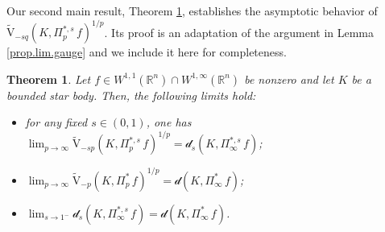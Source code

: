 \documentclass[11pt, reqno]{article}
\newtheorem{theorem}{Theorem}[section]
\theoremstyle{definition}
\numberwithin{equation}{section}
\newcommand{\R}{\mathbb{R}}
\newcommand{\vtil}{\widetilde{\mathrm{V}}}
\newcommand{\dila}{\mathscr{d}}
\begin{document}



\medskip

Our second main result, Theorem \ref{thm.mixed-dila}, establishes the asymptotic behavior of $\vtil_{-sq} (K, \Pi^{\ast, s}_p \, f)^{1/p}$. 
Its proof is an adaptation of the argument in Lemma \ref{prop.lim.gauge} and we include it here for completeness.

\begin{theorem}\label{thm.mixed-dila}
	Let $f \in W^{1, 1}(\R^n) \cap W^{1, \infty}(\R^n)$ be nonzero and let $K$ be a bounded star body.
	Then, the following limits hold: 
	\begin{itemize}
		\item[(i)] for any fixed $s \in (0, 1)$, one has $\textstyle\lim_{p \to \infty} \vtil_{-sp} (K, \Pi^{\ast, s}_p \, f)^{1/p} = \dila_s(K, \Pi^{\ast, s}_\infty \, f)$;
		
		\item[(ii)] $\textstyle\lim_{p \to \infty} \vtil_{-p}(K, \Pi^\ast_p \, f)^{1/p} = \dila(K, \Pi^\ast_\infty \, f)$;
		
		\item[(iii)] $\textstyle\lim_{s \to 1^-} \dila_s(K, \Pi^{\ast, s}_\infty \, f) = \dila(K, \Pi^\ast_\infty \, f)$.
	\end{itemize}
\end{theorem}
\end{document}
